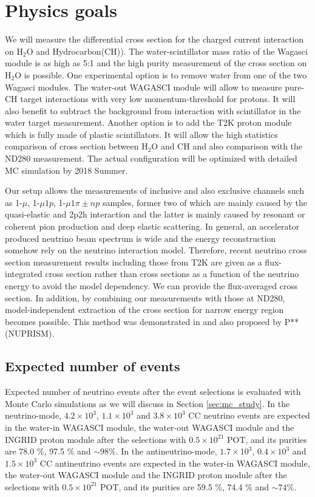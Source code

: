 \section{Physics goals}
We will measure the differential cross section for the charged current interaction on $\mathrm{H_2O}$ and Hydrocarbon(CH)).
The water-scintillator mass ratio of the Wagasci module is as high as 5:1 and the high purity measurement
of the cross section on $\mathrm{H_2O}$ is possible.
One experimental option is to remove water from one of the two Wagasci modules. 
The water-out WAGASCI module will allow to measure pure-CH target interactions with very low momentum-threshold for protons.
It will also benefit to subtract the background from interaction with scintillator in the water target measurement.
Another option is to add the T2K proton module which is fully made of plastic scintillators.
It will allow the high statistics comparison of cross section between $\mathrm{H_2O}$ and CH and also comparison
with the ND280 measurement. The actual configuration will be optimized with detailed MC simulation by 2018 Summer.

Our setup allows the measurements of inclusive and also exclusive channels such as
1-$\mu$, 1-$\mu 1p$, 1-$\mu 1\pi{\pm} np$ samples, former two of which are mainly caused by the quasi-elastic and
2p2h interaction and the latter is mainly caused by resonant or coherent pion production and deep elastic scattering.
In general, an accelerator produced neutrino beam spectrum is wide and the energy reconstruction
somehow rely on the neutrino interaction model.
Therefore, recent neutrino cross section measurement results including those from T2K are given
as a flux-integrated cross section rather than cross sections as a function of the neutrino energy to avoid the model dependency.
We can provide the flux-averaged cross section.
In addition, by combining our measurements with those at ND280, model-independent extraction of the cross section
for narrow energy region becomes possible.
This method was demonstrated in \cite{Abe:2015biq} and also proposed by P** (NUPRISM).

\subsection{Expected number of events}
Expected number of neutrino events after the event selections is evaluated with Monte Carlo simulations as we will discuss in Section \ref{sec:mc_study}.
In the neutrino-mode, $4.2 \times 10^{3}$, $1.1 \times 10^{3}$ and $3.8 \times 10^{3}$ CC neutrino events are expected in the water-in WAGASCI module, the water-out WAGASCI module and the INGRID proton module after the selections with $0.5\times 10^{21}$ POT, and its purities are 78.0 \%, 97.5 \% and $\sim 98 \%$.
In the antineutrino-mode, $1.7 \times 10^{3}$, $0.4 \times 10^{3}$ and $1.5 \times 10^{3}$ CC antineutrino events are expected in the water-in WAGASCI module, the water-out WAGASCI module and the INGRID proton module after the selections with $0.5\times 10^{21}$ POT, and its purities are 59.5 \%, 74.4 \% and $\sim 74 \%$.



